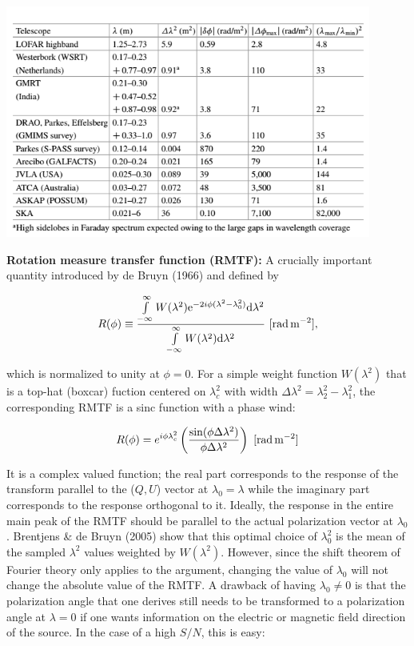 \documentclass[a4paper,10pt]{article}
\begin{document}
\begin{table}[h]
\begin{center}
 \label{table:rmsynthesis}
\includegraphics[width=12cm]{figures/RMsynthesis.png}
\end{center}
\end{table}

{\noindent}\textbf{Rotation measure transfer function (RMTF):} A crucially important quantity introduced by de Bruyn (1966) and defined by

\begin{align*}
    R(\phi) \equiv \dfrac{\int\limits_{-\infty}^\infty W(\lambda^2)\mathrm{e}^{-2i\phi(\lambda^2-\lambda_0^2)}\mathrm{d}\lambda^2}{\int\limits_{-\infty}^\infty W(\lambda^2)\mathrm{d}\lambda^2} ~ [{\rm rad\,m^{-2}}],
\end{align*}

{\noindent}which is normalized to unity at $\phi=0$. For a simple weight function $W(\lambda^2)$ that is a top-hat (boxcar) fuction centered on $\lambda_c^2$ with width $\Delta\lambda^2 = \lambda_2^2-\lambda_1^2$, the corresponding RMTF is a sinc function with a phase wind:

\begin{align*}
    R(\phi) = e^{i\phi\lambda_c^2}\left(\dfrac{\sin(\phi\Delta\lambda^2)}{\phi\Delta\lambda^2}\right) ~ [{\rm rad\,m^{-2}}]
\end{align*}

{\noindent}It is a complex valued function; the real part corresponds to the response of the transform parallel to the ($Q,U$) vector at $\lambda_0=\lambda$ while the imaginary part corresponds to the response orthogonal to it. Ideally, the response in the entire main peak of the RMTF should be parallel to the actual polarization vector at $\lambda_0$. Brentjens \& de Bruyn (2005) show that this optimal choice of $\lambda_0^2$ is the mean of the sampled $\lambda^2$ values weighted by $W(\lambda^2)$. However, since the shift theorem of Fourier theory only applies to the argument, changing the value of $\lambda_0$ will not change the absolute value of the RMTF. A drawback of having $\lambda_0\neq0$ is that the polarization angle that one derives still needs to be transformed to a polarization angle at $\lambda=0$ if one wants information on the electric or magnetic field direction of the source. In the case of a high $S/N$, this is easy:
\end{document}
